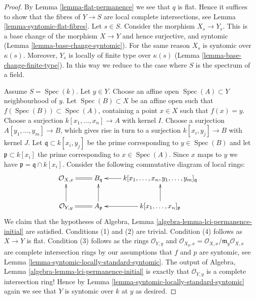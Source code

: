 \documentclass[10pt,a4paper]{amsart}
\theoremstyle{plain}
\theoremstyle{definition}
\theoremstyle{remark}
\numberwithin{equation}{subsection}
\def\Spec{\mathop{\mathrm{Spec}}}
\begin{document}
\begin{proof}
By Lemma \ref{lemma-flat-permanence} we see that $q$ is flat.
Hence it suffices to show that the fibres of $Y \to S$ are
local complete intersections, see Lemma \ref{lemma-syntomic-flat-fibres}.
Let $s \in S$. Consider the morphism $X_s \to Y_s$.
This is a base change of the morphism $X \to Y$ and hence
surjective, and syntomic (Lemma \ref{lemma-base-change-syntomic}).
For the same reason $X_s$ is syntomic over $\kappa(s)$.
Moreover, $Y_s$ is locally of finite type over $\kappa(s)$
(Lemma \ref{lemma-base-change-finite-type}). In this way
we reduce to the case where $S$ is the spectrum of a field.

\medskip\noindent
Assume $S = \Spec(k)$. Let $y \in Y$. Choose an affine
open $\Spec(A) \subset Y$ neighbourhood of $y$. Let
$\Spec(B) \subset X$ be an affine open such that
$f(\Spec(B)) \subset \Spec(A)$, containing
a point $x \in X$ such that $f(x) = y$. Choose a surjection
$k[x_1, \ldots, x_n] \to A$ with kernel $I$.
Choose a surjection $A[y_1, \ldots, y_m] \to B$, which gives
rise in turn to a surjection $k[x_i, y_j] \to B$ with kernel $J$.
Let $\mathfrak q \subset k[x_i, y_j]$ be the prime corresponding
to $y \in \Spec(B)$ and let $\mathfrak p \subset k[x_i]$ the prime
corresponding to $x \in \Spec(A)$.
Since $x$ maps to $y$ we have $\mathfrak p = \mathfrak q \cap k[x_i]$.
Consider the following commutative diagram of local rings:
$$
\xymatrix{
\mathcal{O}_{X, x} \ar@{=}[r] &
B_{\mathfrak q} &
k[x_1, \ldots, x_n, y_1, \ldots, y_m]_{\mathfrak q} \ar[l] \\
\mathcal{O}_{Y, y} \ar@{=}[r] \ar[u] & A_{\mathfrak p} \ar[u] &
k[x_1, \ldots, x_n]_{\mathfrak p} \ar[l] \ar[u]
}
$$
We claim that the hypotheses of
Algebra, Lemma \ref{algebra-lemma-lci-permanence-initial} are satisfied.
Conditions (1) and (2) are trivial. Condition (4) follows as
$X \to Y$ is flat. Condition (3) follows as the rings
$\mathcal{O}_{Y, y}$ and
$\mathcal{O}_{X_y, x} = \mathcal{O}_{X, x}/\mathfrak m_y\mathcal{O}_{X, x}$
are complete intersection rings by our assumptions that
$f$ and $p$ are syntomic, see
Lemma \ref{lemma-syntomic-locally-standard-syntomic}.
The output of Algebra, Lemma \ref{algebra-lemma-lci-permanence-initial}
is exactly that $\mathcal{O}_{Y, y}$ is a complete intersection
ring! Hence by Lemma \ref{lemma-syntomic-locally-standard-syntomic}
again we see that $Y$ is syntomic over $k$ at $y$ as desired.
\end{proof}
\end{document}
